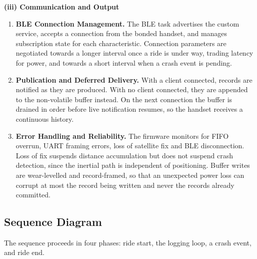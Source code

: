 \documentclass[12pt,a4paper,oneside]{report}
\begin{document}
\vspace{0.5em}
\noindent\textbf{(iii) Communication and Output}

\begin{enumerate}[leftmargin=*,itemsep=0.45em,topsep=0.5em]
\item \textbf{BLE Connection Management.} The BLE task advertises the custom service,
accepts a connection from the bonded handset, and manages subscription state for each
characteristic. Connection parameters are negotiated towards a longer interval once a ride
is under way, trading latency for power, and towards a short interval when a crash event is
pending.

\item \textbf{Publication and Deferred Delivery.} With a client connected, records are
notified as they are produced. With no client connected, they are appended to the
non-volatile buffer instead. On the next connection the buffer is drained in order before
live notification resumes, so the handset receives a continuous history.

\item \textbf{Error Handling and Reliability.} The firmware monitors for FIFO overrun, UART
framing errors, loss of satellite fix and BLE disconnection. Loss of fix suspends distance
accumulation but does not suspend crash detection, since the inertial path is independent of
positioning. Buffer writes are wear-levelled and record-framed, so that an unexpected power
loss can corrupt at most the record being written and never the records already committed.
\end{enumerate}

\subsection{Sequence Diagram}

The sequence proceeds in four phases: ride start, the logging loop, a crash event, and ride
end.
\end{document}
